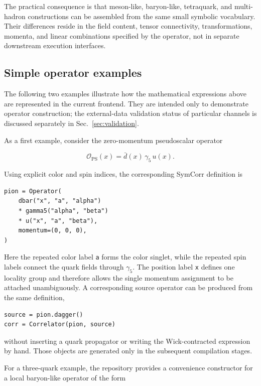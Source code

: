 \documentclass[11pt]{article}
\begin{document}
The practical consequence is that meson-like, baryon-like, tetraquark, and
multi-hadron constructions can be assembled from the same small symbolic
vocabulary. Their differences reside in the field content, tensor
connectivity, transformations, momenta, and linear combinations specified by
the operator, not in separate downstream execution interfaces.

\subsection{Simple operator examples}

The following two examples illustrate how the mathematical expressions above
are represented in the current frontend. They are intended only to demonstrate
operator construction; the external-data validation status of particular
channels is discussed separately in Sec.~\ref{sec:validation}.

As a first example, consider the zero-momentum pseudoscalar operator

\begin{equation}
\mathcal O_{\mathrm{PS}}(x)
=
\bar d(x)\,\gamma_5\,u(x).
\label{eq:simple_pseudoscalar_example}
\end{equation}

Using explicit color and spin indices, the corresponding SymCorr definition is

\begin{verbatim}
pion = Operator(
    dbar("x", "a", "alpha")
    * gamma5("alpha", "beta")
    * u("x", "a", "beta"),
    momentum=(0, 0, 0),
)
\end{verbatim}

Here the repeated color label \texttt{a} forms the color singlet, while the
repeated spin labels connect the quark fields through \(\gamma_5\). The
position label \texttt{x} defines one locality group and therefore allows the
single momentum assignment to be attached unambiguously. A corresponding
source operator can be produced from the same definition,

\begin{verbatim}
source = pion.dagger()
corr = Correlator(pion, source)
\end{verbatim}

without inserting a quark propagator or writing the Wick-contracted expression
by hand. Those objects are generated only in the subsequent compilation stages.

For a three-quark example, the repository provides a convenience constructor
for a local baryon-like operator of the form
\end{document}
